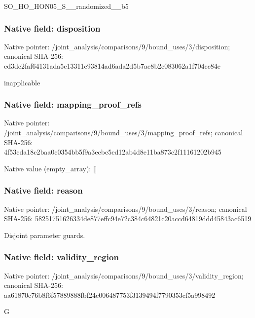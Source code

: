 \documentclass[10pt,a4paper]{article}
\begin{document}
\begingroup\raggedright\sloppy SO\_\allowbreak{}HO\_\allowbreak{}HON05\_\allowbreak{}S\_\allowbreak{}\_\allowbreak{}randomized\_\allowbreak{}\_\allowbreak{}b5\par\endgroup

\subsubsection{Native field: disposition}
Native pointer: /joint\_\allowbreak{}analysis/comparisons/9/bound\_\allowbreak{}uses/3/disposition; canonical SHA-256: cd3dc2faf64131ada5c13311e93814ad6ada2d5b7ae8b2c083062a1f704cc84e

\begingroup\raggedright\sloppy inapplicable\par\endgroup

\subsubsection{Native field: mapping\_\allowbreak{}proof\_\allowbreak{}refs}
Native pointer: /joint\_\allowbreak{}analysis/comparisons/9/bound\_\allowbreak{}uses/3/mapping\_\allowbreak{}proof\_\allowbreak{}refs; canonical SHA-256: 4f53cda18c2baa0c0354bb5f9a3ecbe5ed12ab4d8e11ba873c2f11161202b945

Native value (empty\_\allowbreak{}array): []

\subsubsection{Native field: reason}
Native pointer: /joint\_\allowbreak{}analysis/comparisons/9/bound\_\allowbreak{}uses/3/reason; canonical SHA-256: 58251751626334de877effc94e72c384c64821c20accd64819ddd45843ac6519

\begingroup\raggedright\sloppy Disjoint parameter guards.\par\endgroup

\subsubsection{Native field: validity\_\allowbreak{}region}
Native pointer: /joint\_\allowbreak{}analysis/comparisons/9/bound\_\allowbreak{}uses/3/validity\_\allowbreak{}region; canonical SHA-256: aa61870c76b8f6f57889888fbf24c006487753f3139494f7790353cf5a998492

\begingroup\raggedright\sloppy G\par\endgroup
\end{document}
